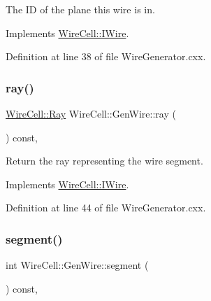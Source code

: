The ID of the plane this wire is in. 



Implements \hyperlink{class_wire_cell_1_1_i_wire_ac1be702dac05d5298f7cf20a5fda910b}{Wire\+Cell\+::\+I\+Wire}.



Definition at line 38 of file Wire\+Generator.\+cxx.

\mbox{\label{class_wire_cell_1_1_gen_wire_a8938590c1c476c57de50ff087f67b8f0}} 
\subsubsection{\texorpdfstring{ray()}{ray()}}
{\footnotesize\ttfamily \hyperlink{namespace_wire_cell_a3ab20d9b438feb7eb1ffaab9ba98af0c}{Wire\+Cell\+::\+Ray} Wire\+Cell\+::\+Gen\+Wire\+::ray (\begin{DoxyParamCaption}{ }\end{DoxyParamCaption}) const\hspace{0.3cm}{\ttfamily [inline]}, {\ttfamily [virtual]}}



Return the ray representing the wire segment. 



Implements \hyperlink{class_wire_cell_1_1_i_wire_aded43e813ce82b02e7fc0316d11cfa43}{Wire\+Cell\+::\+I\+Wire}.



Definition at line 44 of file Wire\+Generator.\+cxx.

\mbox{\label{class_wire_cell_1_1_gen_wire_a27ade571103d3591a7addd4ff9dd757f}} 
\subsubsection{\texorpdfstring{segment()}{segment()}}
{\footnotesize\ttfamily int Wire\+Cell\+::\+Gen\+Wire\+::segment (\begin{DoxyParamCaption}{ }\end{DoxyParamCaption}) const\hspace{0.3cm}{\ttfamily [inline]}, {\ttfamily [virtual]}}




